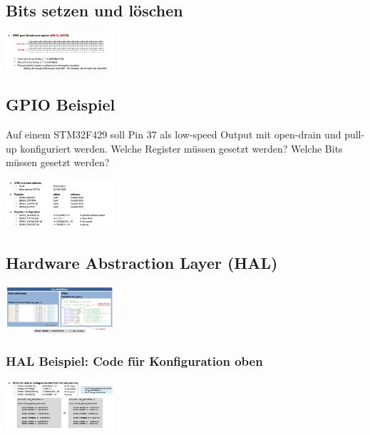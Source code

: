 \subsection{Bits setzen und löschen}
\includegraphics[width=0.3\textwidth]{sections/images/set_gpio.png}

\subsection{GPIO Beispiel}
Auf einem STM32F429 soll Pin 37 als low-speed Output mit open-drain und pull-up konfiguriert werden. Welche Register müssen gesetzt werden? Welche Bits müssen gesetzt werden?

\includegraphics[width=0.3\textwidth]{sections/images/beispiel_gpio.png}

\subsection{Hardware Abstraction Layer (HAL)}
\includegraphics[width=0.3\textwidth]{sections/images/hal.png}

\subsubsection{HAL Beispiel: Code für Konfiguration oben}
\includegraphics[width=0.3\textwidth]{sections/images/code_gpio_beispiel.png}